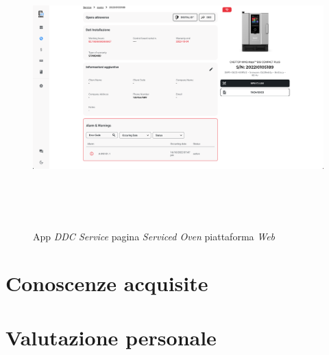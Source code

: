 \begin{figure}[H]
    \centering
    \includegraphics[alt={Screenshot della pagina "Serviced Oven" su piattaforma web}, height=10cm]{img/ServicedOvenWeb}
    \caption{App \textit{DDC Service} pagina \textit{Serviced Oven} piattaforma \textit{Web}}
    \label{fig:servicedovenweb}
\end{figure}



\section{Conoscenze acquisite}

\section{Valutazione personale}

\newpage
